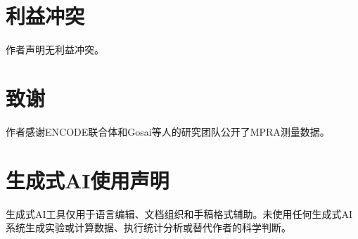 \documentclass[10pt,a4paper]{article}
\begin{document}
\section*{利益冲突}
作者声明无利益冲突。

\section*{致谢}
作者感谢ENCODE联合体和Gosai等人的研究团队公开了MPRA测量数据。

\section*{生成式AI使用声明}
生成式AI工具仅用于语言编辑、文档组织和手稿格式辅助。未使用任何生成式AI系统生成实验或计算数据、执行统计分析或替代作者的科学判断。

\begingroup
\small


\endgroup
\end{document}
